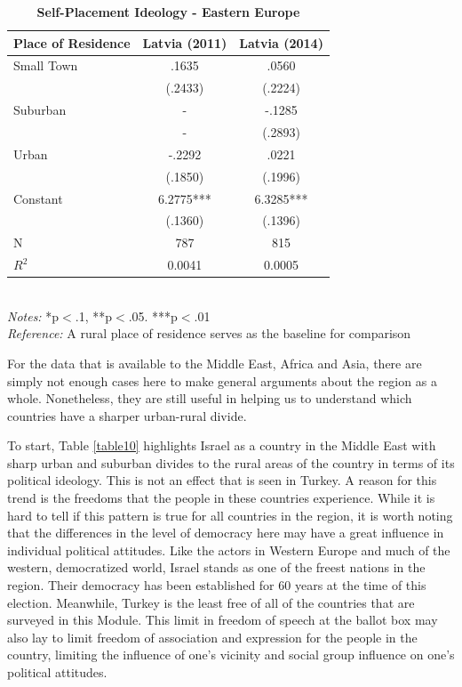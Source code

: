\documentclass[12pt, titlepage]{article}
\newcommand\e{\emph}
\newcommand\tb{\textbf}
\begin{document}
\begin{table}[H]
\centering
	\caption{\tb{Self-Placement Ideology - Eastern Europe}}
	\begin{tabulary}{\linewidth}{l c c}
		\\
		\hline
		\tb{Place of Residence} & \tb{Latvia (2011)} &\tb{Latvia (2014)} \\
		\hline
		Small Town &.1635 &.0560 \\
		&(.2433) & (.2224) \\
		Suburban&- & -.1285 \\
		& - & (.2893) \\
		Urban&-.2292&.0221 \\
		& (.1850) & (.1996) \\
		Constant & 6.2775*** &6.3285*** \\
		& (.1360) & (.1396) \\
		N&787 & 815\\
		$R^2$& 0.0041 &0.0005 \\
		\hline
	\end{tabulary}
\\
\e{Notes:} *p$<$.1, **p$<$.05. ***p$<$.01 \\
\e{Reference:} A rural place of residence serves as the baseline for comparison
\label{table9}
\end{table}

For the data that is available to the Middle East, Africa and Asia, there are simply not enough cases here to make general arguments about the region as a whole. Nonetheless, they are still useful in helping us to understand which countries have a sharper urban-rural divide.

To start, Table \ref{table10} highlights Israel as a country in the Middle East with sharp urban and suburban divides to the rural areas of the country in terms of its political ideology. This is not an effect that is seen in Turkey. A reason for this trend is the freedoms that the people in these countries experience. While it is hard to tell if this pattern is true for all countries in the region, it is worth noting that the differences in the level of democracy here may have a great influence in individual political attitudes. Like the actors in Western Europe and much of the western, democratized world, Israel stands as one of the freest nations in the region. Their democracy has been established for 60 years at the time of this election. Meanwhile, Turkey is the least free of all of the countries that are surveyed in this Module. This limit in freedom of speech at the ballot box may also lay to limit freedom of association and expression for the people in the country, limiting the influence of one's vicinity and social group influence on one's political attitudes.
\end{document}
